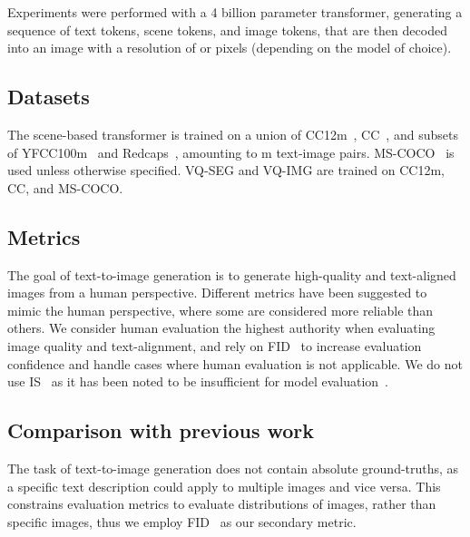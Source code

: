 \documentclass[final]{cvpr}
\begin{document}
Experiments were performed with a 4 billion parameter transformer, generating a sequence of  text tokens,  scene tokens, and  image tokens, that are then decoded into an image with a resolution of  or  pixels (depending on the model of choice).

\subsection{Datasets} The scene-based transformer is trained on a union of CC12m~\cite{changpinyo2021conceptual}, CC~\cite{sharma2018conceptual}, and subsets of YFCC100m~\cite{thomee2016yfcc100m} and Redcaps~\cite{desai2021redcaps}, amounting to m text-image pairs. MS-COCO~\cite{lin2014microsoft} is used unless otherwise specified. VQ-SEG and VQ-IMG are trained on CC12m, CC, and MS-COCO.

\subsection{Metrics} The goal of text-to-image generation is to generate high-quality and text-aligned images from a human perspective. Different metrics have been suggested to mimic the human perspective, where some are considered more reliable than others. We consider human evaluation the highest authority when evaluating image quality and text-alignment, and rely on FID~\cite{heusel2017gans} to increase evaluation confidence and handle cases where human evaluation is not applicable. We do not use IS~\cite{salimans2016improved} as it has been noted to be insufficient for model evaluation~\cite{barratt2018note}.

\subsection{Comparison with previous work}
\label{sec:prev_work}

The task of text-to-image generation does not contain absolute ground-truths, as a specific text description could apply to multiple images and vice versa. This constrains evaluation metrics to evaluate distributions of images, rather than specific images, thus we employ FID~\cite{heusel2017gans} as our secondary metric. 
\end{document}
